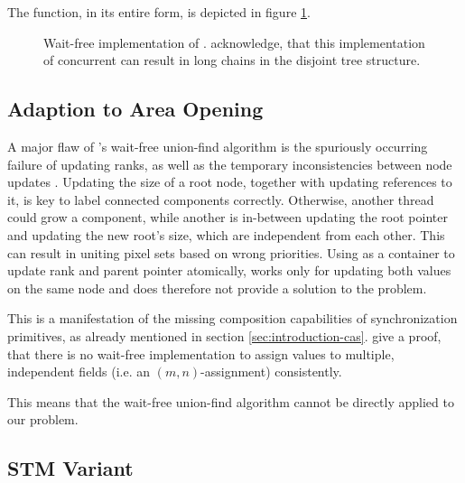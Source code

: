 The  function, in its entire form, is depicted in figure
\ref{fig:union-find-wf-union}.

\begin{figure}
  
  \caption[Wait-free implementation of .]{Wait-free
    implementation of . \citet{Anderson1994Waitfree}
    acknowledge, that this implementation of concurrent  can
    result in long chains in the disjoint tree structure.}
  \label{fig:union-find-wf-union}
\end{figure}

\subsection{Adaption to Area Opening}
\label{sec:union-find-wf-adaption}

A major flaw of \citeauthor{Anderson1994Waitfree}'s wait-free union-find
algorithm is the spuriously occurring failure of updating ranks, as well as the
temporary inconsistencies between node updates \cite{Anderson1994Waitfree,
  Berman2010Multicore}. Updating the size of a root node, together with updating
references to it, is key to label connected components correctly. Otherwise,
another thread could grow a component, while another is in-between updating the
root pointer and updating the new root's size, which are independent from each
other. This can result in uniting pixel sets based on wrong priorities. Using
 as a container to update rank and parent pointer atomically,
works only for updating both values on the same node and does therefore not
provide a solution to the problem.

This is a manifestation of the missing composition capabilities of
synchronization primitives, as already mentioned in section
\ref{sec:introduction-cas}. \citet{Herlihy2008Art} give a proof, that there is
no wait-free implementation to assign values to multiple, independent fields
(i.e. an $(m,n)$-assignment) consistently.

This means that the wait-free union-find algorithm cannot be directly applied to
our problem.

\subsection{STM Variant}
\label{sec:union-find-wf-stm}

